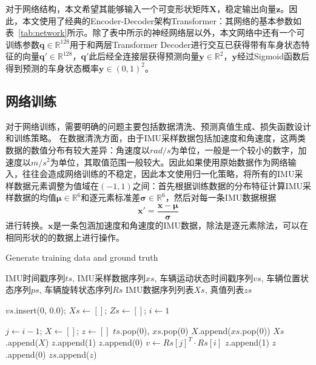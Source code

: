 对于网络结构，本文希望其能够输入一个可变形状矩阵$\symbf{X}$，稳定输出向量$\symbf{z}$。因此，本文使用了经典的Encoder-Decoder架构Transformer\cite{vaswani2017attention}：其网络的基本参数如表~\ref{tab:network}所示。除了表中所示的神经网络层以外，本文网络中还有一个可训练参数$\symbf{q} \in \mathbb{R}^{128}$用于和两层Transformer Decoder进行交互已获得带有车身状态特征的向量$\symbf{q}' \in \mathbb{R}^{128}$，$\symbf{q}'$此后经全连接层获得预测向量$\symbf{y} \in \mathbb{R}^2$，$\symbf{y}$经过Sigmoid函数后得到预测的车身状态概率$\symbf{y} \in (0, 1)^2$。

\subsection{网络训练}

对于网络训练，需要明确的问题主要包括数据清洗、预测真值生成、损失函数设计和训练策略。
在数据清洗方面，由于IMU采样数据包括加速度和角速度，这两类数据的数值分布有较大差异：角速度以$rad/s$为单位，一般是一个较小的数字，加速度以$m/s^2$为单位，其取值范围一般较大。因此如果使用原始数据作为网络输入，往往会造成网络训练的不稳定，因此本文使用归一化策略，将所有的IMU采样数据元素调整为值域在$(-1, 1)$之间：首先根据训练数据的分布特征计算IMU采样数据的均值$\symbf{\mu}\in \mathbb{R}^6$和逐元素标准差$\symbf{\sigma}\in \mathbb{R}^6$，然后对每一条IMU数据根据
\begin{equation}
  \symbf{x}' = \frac{\symbf{x} - \symbf{\mu}}{\symbf{\sigma}}
\end{equation}
进行转换。$\symbf{x}$是一条包涵加速度和角速度的IMU数据，除法是逐元素除法，可以在相同形状的的数据上进行操作。

\renewcommand{\algorithmicrequire}{\textbf{输入：}\unskip}
\renewcommand{\algorithmicensure}{\textbf{输出：}\unskip}
\begin{algorithm}
  \caption{Generate training data and ground truth}
  \label{alg1}
  \small
  \begin{algorithmic}[1]
    \REQUIRE IMU时间戳序列$ts$, IMU采样数据序列$xs$, 车辆运动状态时间戳序列$vs$, 车辆位置状态序列$ps$, 车辆旋转状态序列$Rs$
    \ENSURE IMU数据序列列表$Xs$, 真值列表$zs$

    \STATE $vs$.insert(0, 0.0); $Xs \leftarrow []$; $Zs \leftarrow []$; $i \leftarrow 1$

      \STATE $j \leftarrow i-1$; $X \leftarrow []$; $z \leftarrow []$
        \STATE $ts$.pop(0), $xs$.pop(0)
      \ENDWHILE
        \STATE $X$.append($xs$.pop(0))
      \ENDWHILE
      \STATE $Xs$.append($X$)
        \STATE $z$.append(1)
      \ELSE
        \STATE $z$.append(0)
      \ENDIF
      \STATE $v \leftarrow Rs[j]^T \cdot Rs[i]$
        \STATE $z$.append(1)
      \ELSE
        \STATE $z$.append(0)
      \ENDIF
      \STATE $zs$.append($z$)
    \ENDWHILE
  \end{algorithmic}
\end{algorithm}

